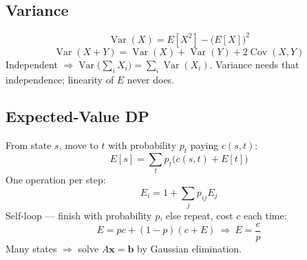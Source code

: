 \subsection{Variance}
\[\operatorname{Var}(X)=E[X^2]-\bigl(E[X]\bigr)^2\]
\[\operatorname{Var}(X+Y)=\operatorname{Var}(X)+\operatorname{Var}(Y)
  +2\operatorname{Cov}(X,Y)\]
\noindent Independent $\Rightarrow
\operatorname{Var}\bigl(\sum_i X_i\bigr)=\sum_i\operatorname{Var}(X_i)$.
Variance needs that independence; linearity of $E$ never does.

\subsection{Expected-Value DP}
\noindent From state $s$, move to $t$ with probability $p_t$ paying
$c(s,t)$:
\[E[s]=\sum_t p_t\bigl(c(s,t)+E[t]\bigr)\]
\noindent One operation per step:
\[E_i=1+\sum_j p_{ij}E_j\]
\noindent Self-loop --- finish with probability $p$, else repeat, cost
$c$ each time:
\[E=pc+(1-p)(c+E)\ \Longrightarrow\ E=\frac{c}{p}\]
\noindent Many states $\Rightarrow$ solve $A\mathbf{x}=\mathbf{b}$ by
Gaussian elimination.
